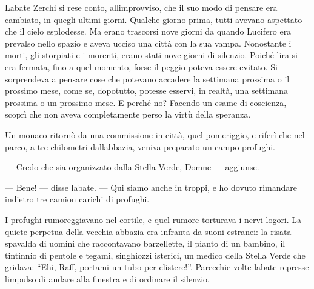 L\textquotesingle abate Zerchi si rese conto,
all\textquotesingle improvviso, che il suo modo di pensare era cambiato,
in quegli ultimi giorni. Qualche giorno prima, tutti avevano aspettato
che il cielo esplodesse. Ma erano trascorsi nove giorni da quando
Lucifero era prevalso nello spazio e aveva ucciso una città con la sua
vampa. Nonostante i morti, gli storpiati e i morenti, erano stati nove
giorni di silenzio. Poiché l\textquotesingle ira si era fermata, fino a
quel momento, forse il peggio poteva essere evitato. Si sorprendeva a
pensare cose che potevano accadere la settimana prossima o il prossimo
mese, come se, dopotutto, potesse esservi, in realtà, una settimana
prossima o un prossimo mese. E perché no? Facendo un esame di coscienza,
scoprì che non aveva completamente perso la virtù della speranza.

Un monaco ritornò da una commissione in città, quel pomeriggio, e riferì
che nel parco, a tre chilometri dall\textquotesingle abbazia, veniva
preparato un campo profughi.

--- Credo che sia organizzato dalla Stella Verde, Domne --- aggiunse.

--- Bene! --- disse l\textquotesingle abate. --- Qui siamo anche in
troppi, e ho dovuto rimandare indietro tre camion carichi di profughi.

I profughi rumoreggiavano nel cortile, e quel rumore torturava i nervi
logori. La quiete perpetua della vecchia abbazia era infranta da suoni
estranei: la risata spavalda di uomini che raccontavano barzellette, il
pianto di un bambino, il tintinnio di pentole e tegami, singhiozzi
isterici, un medico della Stella Verde che gridava: ``Ehi, Raff, portami
un tubo per clistere!''. Parecchie volte l\textquotesingle abate
represse l\textquotesingle impulso di andare alla finestra e di ordinare
il silenzio.

